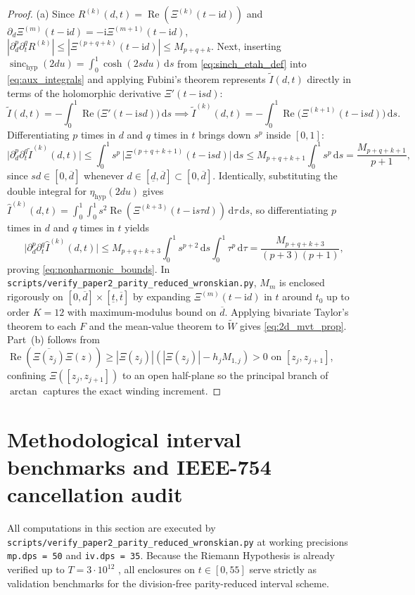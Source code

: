 \documentclass[11pt,a4paper,reqno]{amsart}
\theoremstyle{definition}
\theoremstyle{remark}
\numberwithin{equation}{section}
\newcommand{\dd}{\mathrm{d}}
\newcommand{\ii}{\mathrm{i}}
\newcommand{\Rea}{\operatorname{Re}}
\newcommand{\Wtil}{\widetilde{W}}
\newcommand{\sinch}{\operatorname{sinc}_{\mathrm{hyp}}}
\newcommand{\etah}{\eta_{\mathrm{hyp}}}
\begin{document}
\begin{proof}
(a) Since $R^{(k)}(d,t) = \Rea(\Xi^{(k)}(t-\ii d))$ and $\partial_d\Xi^{(m)}(t-\ii d) = -\ii\Xi^{(m+1)}(t-\ii d)$, $|\partial_d^p\partial_t^q R^{(k)}| \le |\Xi^{(p+q+k)}(t-\ii d)| \le M_{p+q+k}$. Next, inserting $\sinch(2d u) = \int_0^1 \cosh(2s d u)\,\dd s$ from \eqref{eq:sinch_etah_def} into \eqref{eq:aux_integrals} and applying Fubini's theorem represents $\widetilde{I}(d,t)$ directly in terms of the holomorphic derivative $\Xi'(t - \ii s d)$:
\[
\widetilde{I}(d,t) = -\int_0^1 \Rea\!\big(\Xi'(t - \ii s d)\big)\,\dd s \implies \widetilde{I}^{(k)}(d,t) = -\int_0^1 \Rea\!\big(\Xi^{(k+1)}(t - \ii s d)\big)\,\dd s.
\]
Differentiating $p$ times in $d$ and $q$ times in $t$ brings down $s^p$ inside $[0,1]$:
\[
\big|\partial_d^p \partial_t^q \widetilde{I}^{(k)}(d,t)\big| \le \int_0^1 s^p\,\big|\Xi^{(p+q+k+1)}(t - \ii s d)\big|\,\dd s \le M_{p+q+k+1}\int_0^1 s^p\,\dd s = \frac{M_{p+q+k+1}}{p+1},
\]
since $s d \in [0, \overline{d}]$ whenever $d \in [\underline{d}, \overline{d}] \subset [0, \overline{d}]$. Identically, substituting the double integral for $\etah(2d u)$ gives $\widehat{I}^{(k)}(d,t) = \int_0^1\int_0^1 s^2\Rea(\Xi^{(k+3)}(t - \ii s\tau d))\,\dd\tau\,\dd s$, so differentiating $p$ times in $d$ and $q$ times in $t$ yields
\[
\big|\partial_d^p \partial_t^q \widehat{I}^{(k)}(d,t)\big| \le M_{p+q+k+3}\int_0^1 s^{p+2}\,\dd s \int_0^1 \tau^p\,\dd\tau = \frac{M_{p+q+k+3}}{(p+3)(p+1)},
\]
proving \eqref{eq:nonharmonic_bounds}. In \nolinkurl{scripts/verify_paper2_parity_reduced_wronskian.py}, $M_m$ is enclosed rigorously on $[0,\overline{d}] \times [\underline{t},\overline{t}]$ by expanding $\Xi^{(m)}(t - \ii d)$ in $t$ around $t_0$ up to order $K = 12$ with maximum-modulus bound on $\overline{d}$. Applying bivariate Taylor's theorem to each $F$ and the mean-value theorem to $\Wtil$ gives \eqref{eq:2d_mvt_prop}. Part~(b) follows from $\Rea(\overline{\Xi(z_j)}\Xi(z)) \ge |\Xi(z_j)|(|\Xi(z_j)| - h_j M_{1,j}) > 0$ on $[z_j,z_{j+1}]$, confining $\Xi([z_j,z_{j+1}])$ to an open half-plane so the principal branch of $\arctan$ captures the exact winding increment.
\end{proof}

\section{Methodological interval benchmarks and IEEE-754 cancellation audit}\label{sec:numerics}

All computations in this section are executed by \nolinkurl{scripts/verify_paper2_parity_reduced_wronskian.py} at working precisions \texttt{mp.dps = 50} and \texttt{iv.dps = 35}. Because the Riemann Hypothesis is already verified up to $T = 3 \cdot 10^{12}$ \cite{Gram1903,TitchmarshComrie1936,Turing1953,PlattTrudgian2021}, all enclosures on $t \in [0, 55]$ serve strictly as validation benchmarks for the division-free parity-reduced interval scheme.
\end{document}
